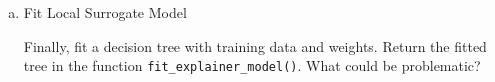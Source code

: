 {\begin{enumerate}[a)]
\begin{equation}
    \phi_{\xv}(\mathbf{z}) = exp(-d(\xv, \mathbf{z})^2/\sigma^2).
    \label{eq:dist}
\end{equation}

\noindent To make plotting easier later on, the weights should be normalized between zero and one. Finally, return the normalized weights in \texttt{weight\_points()}.

\item Fit Local Surrogate Model

Finally, fit a decision tree with training data and weights. Return the fitted tree in the function \texttt{fit\_explainer\_model()}. 
What could be problematic?

\end{enumerate}
}
